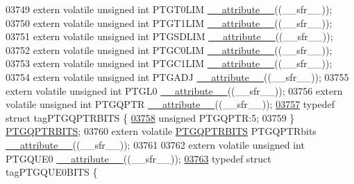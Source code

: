 \begin{DoxyCode}
03749 \textcolor{keyword}{extern} \textcolor{keyword}{volatile} \textcolor{keywordtype}{unsigned} \textcolor{keywordtype}{int}  PTGT0LIM \hyperlink{a00015_a493c46f03454991ccc5aa7a6e1dfb2a7}{\_\_attribute\_\_}((\_\_sfr\_\_));
03750 \textcolor{keyword}{extern} \textcolor{keyword}{volatile} \textcolor{keywordtype}{unsigned} \textcolor{keywordtype}{int}  PTGT1LIM \hyperlink{a00015_a493c46f03454991ccc5aa7a6e1dfb2a7}{\_\_attribute\_\_}((\_\_sfr\_\_));
03751 \textcolor{keyword}{extern} \textcolor{keyword}{volatile} \textcolor{keywordtype}{unsigned} \textcolor{keywordtype}{int}  PTGSDLIM \hyperlink{a00015_a493c46f03454991ccc5aa7a6e1dfb2a7}{\_\_attribute\_\_}((\_\_sfr\_\_));
03752 \textcolor{keyword}{extern} \textcolor{keyword}{volatile} \textcolor{keywordtype}{unsigned} \textcolor{keywordtype}{int}  PTGC0LIM \hyperlink{a00015_a493c46f03454991ccc5aa7a6e1dfb2a7}{\_\_attribute\_\_}((\_\_sfr\_\_));
03753 \textcolor{keyword}{extern} \textcolor{keyword}{volatile} \textcolor{keywordtype}{unsigned} \textcolor{keywordtype}{int}  PTGC1LIM \hyperlink{a00015_a493c46f03454991ccc5aa7a6e1dfb2a7}{\_\_attribute\_\_}((\_\_sfr\_\_));
03754 \textcolor{keyword}{extern} \textcolor{keyword}{volatile} \textcolor{keywordtype}{unsigned} \textcolor{keywordtype}{int}  PTGADJ \hyperlink{a00015_a493c46f03454991ccc5aa7a6e1dfb2a7}{\_\_attribute\_\_}((\_\_sfr\_\_));
03755 \textcolor{keyword}{extern} \textcolor{keyword}{volatile} \textcolor{keywordtype}{unsigned} \textcolor{keywordtype}{int}  PTGL0 \hyperlink{a00015_a493c46f03454991ccc5aa7a6e1dfb2a7}{\_\_attribute\_\_}((\_\_sfr\_\_));
03756 \textcolor{keyword}{extern} \textcolor{keyword}{volatile} \textcolor{keywordtype}{unsigned} \textcolor{keywordtype}{int}  PTGQPTR \hyperlink{a00015_a493c46f03454991ccc5aa7a6e1dfb2a7}{\_\_attribute\_\_}((\_\_sfr\_\_));
\hypertarget{a00015_source_l03757}{}\hyperlink{a00014}{03757} \textcolor{keyword}{typedef} \textcolor{keyword}{struct }tagPTGQPTRBITS \{
\hypertarget{a00015_source_l03758}{}\hyperlink{a00014_a27d47351bf197503c30730d25ebf22d9}{03758}   \textcolor{keywordtype}{unsigned} PTGQPTR:5;
03759 \} \hyperlink{a00014_d8/d7a/a00669}{PTGQPTRBITS};
03760 \textcolor{keyword}{extern} \textcolor{keyword}{volatile} \hyperlink{a00014_d8/d7a/a00669}{PTGQPTRBITS} PTGQPTRbits \hyperlink{a00015_a493c46f03454991ccc5aa7a6e1dfb2a7}{\_\_attribute\_\_}((\_\_sfr\_\_));
03761 
03762 \textcolor{keyword}{extern} \textcolor{keyword}{volatile} \textcolor{keywordtype}{unsigned} \textcolor{keywordtype}{int}  PTGQUE0 \hyperlink{a00015_a493c46f03454991ccc5aa7a6e1dfb2a7}{\_\_attribute\_\_}((\_\_sfr\_\_));
\hypertarget{a00015_source_l03763}{}\hyperlink{a00014}{03763} \textcolor{keyword}{typedef} \textcolor{keyword}{struct }tagPTGQUE0BITS \{

\end{DoxyCode}
